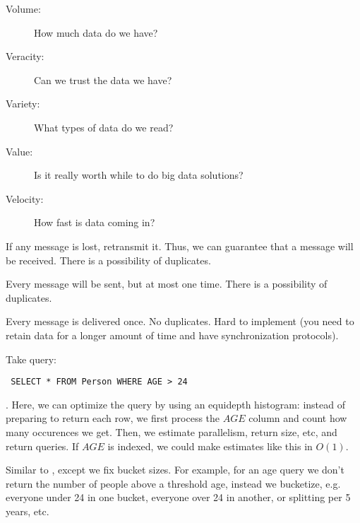 \begin{definition}\label{def:fiveV}
    \begin{description}
        \item[Volume:] How much data do we have?
        \item[Veracity:] Can we trust the data we have?
        \item[Variety:] What types of data do we read?
        \item[Value:] Is it really worth while to do big data solutions?
        \item[Velocity:] How fast is data coming in?
    \end{description}
\end{definition}

\begin{definition}\label{def:atleastonce}
    If any message is lost, retransmit it. Thus, we can guarantee that a message will be received.
    There is a possibility of duplicates.
\end{definition}

\begin{definition}\label{def:atmostonce}
    Every message will be sent, but at most one time.
    There is a possibility of duplicates.
\end{definition}

\begin{definition}\label{def:exactlyonce}
    Every message is delivered once. No duplicates. Hard to implement (you need to retain data for a longer amount of time and have synchronization protocols).
\end{definition}

\begin{definition}\label{def:equidepthhistogram}
Take query: 
\begin{verbatim} SELECT * FROM Person WHERE AGE > 24 \end{verbatim}.
Here, we can optimize the query by using an equidepth histogram:
instead of preparing to return each row, we first process the $AGE$ column and count 
how many occurences we get. Then, we estimate parallelism, return size, etc, and return queries.
If $AGE$ is indexed, we could make estimates like  this in $O(1)$.
\end{definition}

\begin{definition}
    Similar to , except we fix bucket sizes.
    For example, for an age query we don't return the number of people above a threshold age,
    instead we bucketize, e.g. everyone under 24 in one bucket, everyone over 24 in another,
    or splitting per 5 years, etc.
\end{definition}


